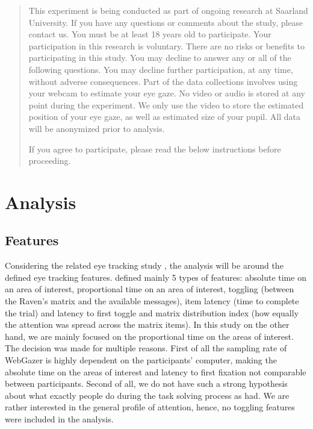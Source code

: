 \begin{quote}
    This experiment is being conducted as part of ongoing research at Saarland University. If you have any questions or comments about the study, please contact us. You must be at least 18 years old to participate. Your participation in this research is voluntary. There are no risks or benefits to participating in this study. You may decline to answer any or all of the following questions. You may decline further participation, at any time, without adverse consequences. Part of the data collections involves using your webcam to estimate your eye gaze. No video or audio is stored at any point during the experiment. We only use the video to store the estimated position of your eye gaze, as well as estimated size of your pupil. All data will be anonymized prior to analysis. 

    If you agree to participate, please read the below instructions before proceeding.
\end{quote}


\section{Analysis}
\label{sec:analysis}

\subsection{Features}
\label{sec:analysis:features}
Considering the related eye tracking study \cite{Vigneau_2006}, the analysis will be around the defined eye tracking features. \cite{Vigneau_2006} defined mainly 5 types of features: absolute time on an area of interest, proportional time on an area of interest, toggling (between the Raven's matrix and the available messages), item latency (time to complete the trial) and latency to first toggle and matrix distribution index (how equally the attention was spread across the matrix items). In this study on the other hand, we are mainly focused on the proportional time on the areas of interest. The decision was made for multiple reasons. First of all the sampling rate of WebGazer is highly dependent on the participants' computer, making the absolute time on the areas of interest and latency to first fixation not comparable between participants. Second of all, we do not have such a strong hypothesis about what exactly people do during the task solving process as \cite{Vigneau_2006} had. We are rather interested in the general profile of attention, hence, no toggling features were included in the analysis. 


